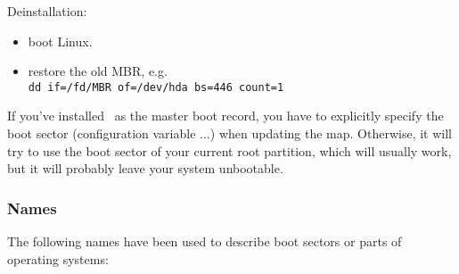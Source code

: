 Deinstallation:
\begin{itemize}
  \item boot Linux.
  \item restore the old MBR, e.g. \\
    \verb"dd if=/fd/MBR of=/dev/hda bs=446 count=1"
\end{itemize}

If you've installed \LILO\ as the master boot record, you have to
explicitly specify the boot sector (configuration variable
$\ldots$) when updating the map. Otherwise, it
will try to use the boot sector of your current root partition, which
will usually work, but it will probably leave your system unbootable.


\subsubsection{Names}

The following names have been used to describe boot sectors or parts of
operating systems:

